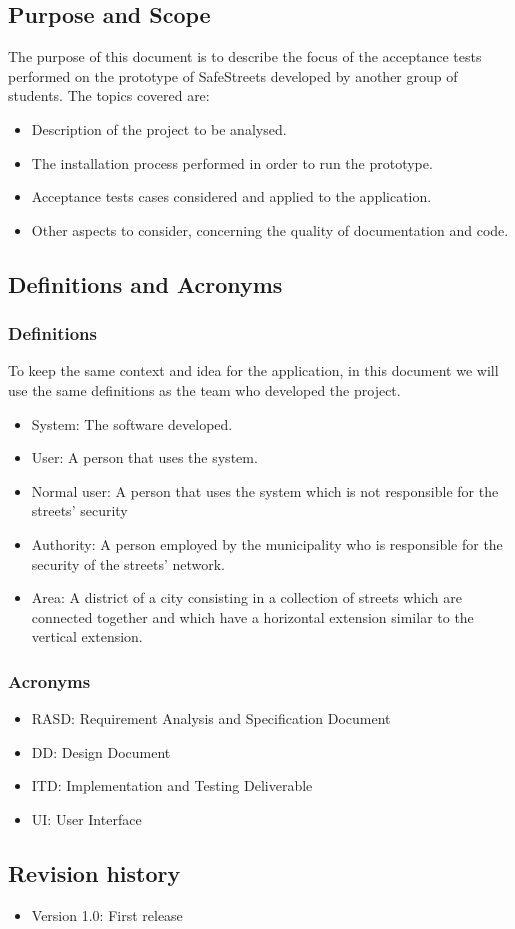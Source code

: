 \subsection{Purpose and Scope}

The purpose of this document is to describe the focus of the acceptance tests performed on the prototype of SafeStreets developed by another group of students.
The topics covered are:
\begin{itemize}
    \item 
    Description of the project to be analysed.
    \item 
    The installation process performed in order to run the prototype.
    \item
    Acceptance tests cases considered and applied to the application.
    \item
    Other aspects to consider, concerning the quality of documentation and code.
\end{itemize}

\subsection{Definitions and Acronyms}
\subsubsection{Definitions}
To keep the same context and idea for the application, in this document we will use the same definitions as the team who developed the project.

\begin{itemize}
    \item System: The software developed.
    \item User: A person that uses the system.
    \item Normal user: A person that uses the system which is not responsible for the streets’ security
    \item Authority: A person employed by the municipality who is responsible for the security of the streets’ network.
    \item Area: A district of a city consisting in a collection of streets which are connected together and which have a horizontal extension similar to the vertical extension.
\end{itemize}

\subsubsection{Acronyms}
\begin{itemize}
    \item
    RASD: Requirement Analysis and Specification Document
    \item
    DD: Design Document
    \item
    ITD: Implementation and Testing Deliverable
    \item
    UI: User Interface
\end{itemize}

\subsection{Revision history}

\begin{itemize}
    \item Version 1.0: First release
\end{itemize}